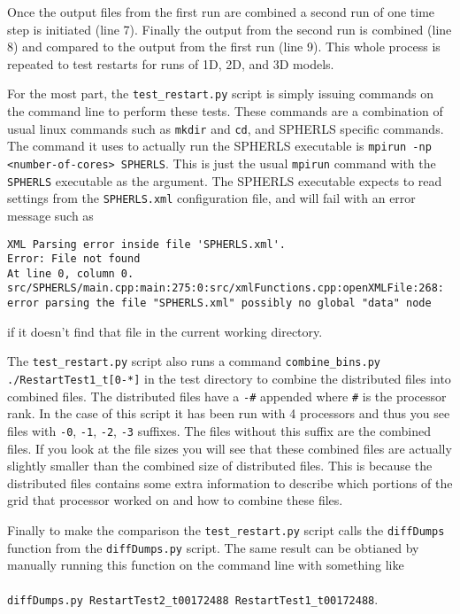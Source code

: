 \documentclass[12pt,a4paper]{book}
\begin{document}
Once the output files from the first run are combined a second run of one time step is initiated (line 7). Finally the output from the second run is combined (line 8) and compared to the output from the first run (line 9). This whole process is repeated to test restarts for runs of 1D, 2D, and 3D models.

For the most part, the {\tt test\_restart.py} script is simply issuing commands on the command line to perform these tests. These commands are a combination of usual linux commands such as {\tt mkdir} and {\tt cd}, and SPHERLS specific commands. The command it uses to actually run the SPHERLS executable is {\tt mpirun -np <number-of-cores> SPHERLS}. This is just the usual {\tt mpirun} command with the {\tt SPHERLS} executable as the argument. The SPHERLS executable expects to read settings from the {\tt SPHERLS.xml} configuration file, and will fail with an error message such as 

{\tiny
\begin{verbatim}
XML Parsing error inside file 'SPHERLS.xml'.
Error: File not found
At line 0, column 0.
src/SPHERLS/main.cpp:main:275:0:src/xmlFunctions.cpp:openXMLFile:268: error parsing the file "SPHERLS.xml" possibly no global "data" node
\end{verbatim}
}

if it doesn't find that file in the current working directory.

The {\tt test\_restart.py} script also runs a command {\tt combine\_bins.py ./RestartTest1_t[0-*]} in the test directory to combine the distributed files into combined files. The distributed files have a {\tt -\#} appended where {\tt \#} is the processor rank. In the case of this script it has been run with 4 processors and thus you see files with {\tt -0}, {\tt -1}, {\tt -2}, {\tt -3} suffixes. The files without this suffix are the combined files. If you look at the file sizes you will see that these combined files are actually slightly smaller than the combined size of distributed files. This is because the distributed files contains some extra information to describe which portions of the grid that processor worked on and how to combine these files.

Finally to make the comparison the {\tt test\_restart.py} script calls the {\tt diffDumps} function from the {\tt diffDumps.py} script. The same result can be obtianed by manually running this function on the command line with something like\\
 \\
{\tt diffDumps.py RestartTest2_t00172488 RestartTest1_t00172488}.\\
 \\
\end{document}
